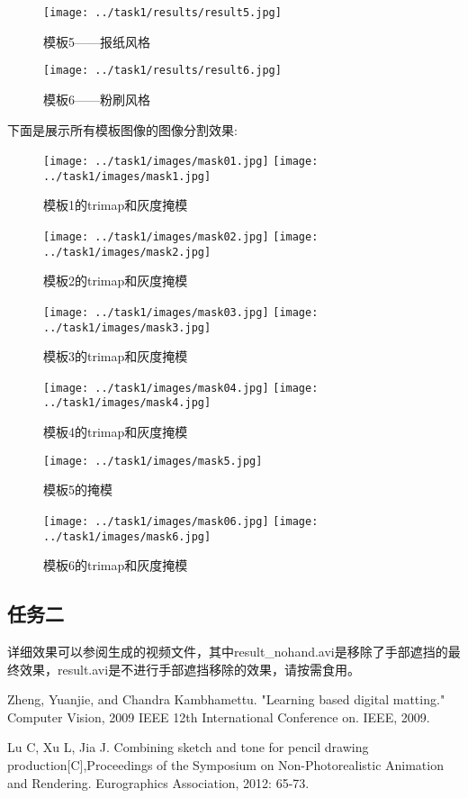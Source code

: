 \documentclass[UTF8]{ctexart}
\begin{document}
\begin{figure}[H]
    \centering
    \texttt{[image: ../task1/results/result5.jpg]}
    \caption{模板5——报纸风格}
\end{figure}

\begin{figure}[H]
    \centering
    \texttt{[image: ../task1/results/result6.jpg]}
    \caption{模板6——粉刷风格}
\end{figure}

下面是展示所有模板图像的图像分割效果:

\begin{figure}[H]
    \centering
    \texttt{[image: ../task1/images/mask01.jpg]}
    \texttt{[image: ../task1/images/mask1.jpg]}
    \caption{模板1的trimap和灰度掩模}
\end{figure}

\begin{figure}[H]
    \centering
    \texttt{[image: ../task1/images/mask02.jpg]}
    \texttt{[image: ../task1/images/mask2.jpg]}
    \caption{模板2的trimap和灰度掩模}
\end{figure}

\begin{figure}[H]
    \centering
    \texttt{[image: ../task1/images/mask03.jpg]}
    \texttt{[image: ../task1/images/mask3.jpg]}
    \caption{模板3的trimap和灰度掩模}
\end{figure}

\begin{figure}[H]
    \centering
    \texttt{[image: ../task1/images/mask04.jpg]}
    \texttt{[image: ../task1/images/mask4.jpg]}
    \caption{模板4的trimap和灰度掩模}
\end{figure}

\begin{figure}[H]
    \centering
    \texttt{[image: ../task1/images/mask5.jpg]}
    \caption{模板5的掩模}
\end{figure}

\begin{figure}[H]
    \centering
    \texttt{[image: ../task1/images/mask06.jpg]}
    \texttt{[image: ../task1/images/mask6.jpg]}
    \caption{模板6的trimap和灰度掩模}
\end{figure}

\subsection{任务二}    
详细效果可以参阅生成的视频文件，其中result\_nohand.avi是移除了手部遮挡的最终效果，result.avi是不进行手部遮挡移除的效果，请按需食用。

\begin{thebibliography}{99}
    Zheng, Yuanjie, and Chandra Kambhamettu. "Learning based digital matting." Computer Vision, 2009 IEEE 12th International Conference on. IEEE, 2009.
    
    Lu C, Xu L, Jia J. Combining sketch and tone for pencil drawing production[C],Proceedings of the Symposium on Non-Photorealistic Animation and Rendering. Eurographics Association, 2012: 65-73.
\end{thebibliography}
\end{document}
